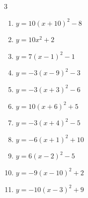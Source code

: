 \begin{multicols}{3}
\begin{enumerate}
  \item $\displaystyle y=10\left( x+10\right)^{2}-8$

        \phantom{$\displaystyle 頂点\left( -10 , -8 \right)$}

  \item $\displaystyle y=10x^{2}+2$

        \phantom{$\displaystyle 頂点\left( 0 , 2 \right)$}

  \item $\displaystyle y=7\left( x-1\right)^{2}-1$

        \phantom{$\displaystyle 頂点\left( 1 , -1 \right)$}

  \item $\displaystyle y=-3\left( x-9\right)^{2}-3$

        \phantom{$\displaystyle 頂点\left( 9 , -3 \right)$}

  \item $\displaystyle y=-3\left( x+3\right)^{2}-6$

        \phantom{$\displaystyle 頂点\left( -3 , -6 \right)$}

  \item $\displaystyle y=10\left( x+6\right)^{2}+5$

        \phantom{$\displaystyle 頂点\left( -6 , 5 \right)$}

  \item $\displaystyle y=-3\left( x+4\right)^{2}-5$

        \phantom{$\displaystyle 頂点\left( -4 , -5 \right)$}

\columnbreak %

  \item $\displaystyle y=-6\left( x+1\right)^{2}+10$

        \phantom{$\displaystyle 頂点\left( -1 , 10 \right)$}

  \item $\displaystyle y=6\left( x-2\right)^{2}-5$

        \phantom{$\displaystyle 頂点\left( 2 , -5 \right)$}

  \item $\displaystyle y=-9\left( x-10\right)^{2}+2$

        \phantom{$\displaystyle 頂点\left( 10 , 2 \right)$}

  \item $\displaystyle y=-10\left( x-3\right)^{2}+9$

        \phantom{$\displaystyle 頂点\left( 3 , 9 \right)$}


\end{enumerate}
\end{multicols}
